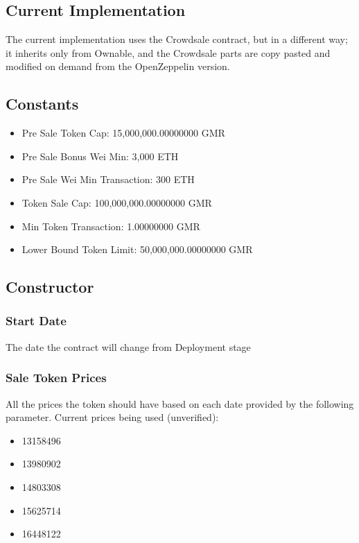 \documentclass[11pt]{article} %
\begin{document}
\subsection{Current Implementation}
The current implementation uses the Crowdsale contract, but in a different way; it inherits only from Ownable, and the Crowdsale parts are copy pasted and modified on demand from the OpenZeppelin version.

\subsection{Constants}

\begin{itemize}
\item Pre Sale Token Cap: 15,000,000.00000000 GMR
\item Pre Sale Bonus Wei Min: 3,000 ETH
\item Pre Sale Wei Min Transaction: 300 ETH
\item Token Sale Cap: 100,000,000.00000000 GMR
\item Min Token Transaction: 1.00000000 GMR
\item Lower Bound Token Limit: 50,000,000.00000000 GMR
\end{itemize}

\subsection{Constructor}

\subsubsection{Start Date}
The date the contract will change from Deployment stage


\subsubsection{Sale Token Prices}
All the prices the token should have based on each date provided by the following parameter.
Current prices being used (unverified): 

\begin{itemize}
\item 13158496
\item 13980902
\item 14803308
\item 15625714
\item 16448122
\end{itemize}
\end{document}
